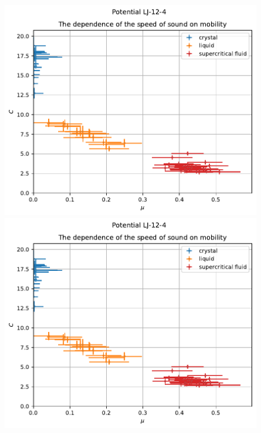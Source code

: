\documentclass[pdf,hyperref={unicode}]{beamer}
\begin{document}
\begin{frame}
\transdissolve[duration=0.2]

\begin{figure}[h]
\begin{center}
\begin{minipage}[h]{0.35\linewidth}
\includegraphics[width=\textwidth, keepaspectratio]{sound_speed_mobility_Potential LJ-12-4_1}
\end{minipage}
\begin{minipage}[h]{0.35\linewidth}
\includegraphics[width=\textwidth, keepaspectratio]{sound_speed_mobility_Potential LJ-12-4_1}
\end{minipage}


\end{center}
\end{figure}
\end{frame}
\end{document}
